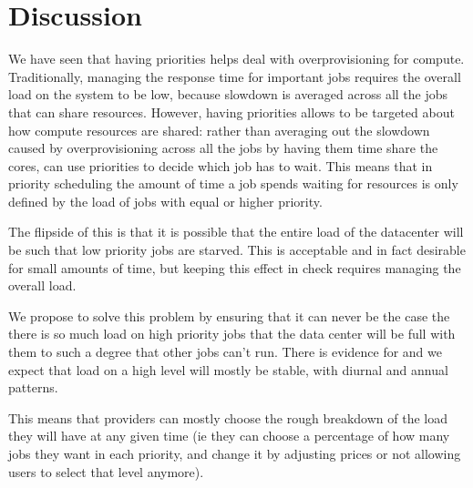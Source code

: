 \section{Discussion}


We have seen that having priorities helps \sys{} deal with overprovisioning for
compute. Traditionally, managing the response time for important jobs requires
the overall load on the system to be low, because slowdown is averaged across
all the jobs that can share resources. However, having priorities allows \sys{}
to be targeted about how compute resources are shared: rather than averaging out
the slowdown caused by overprovisioning across all the jobs by having them time
share the cores, \sys{} can use priorities to decide which job has to wait. This
means that in priority scheduling the amount of time a job spends waiting for
resources is only defined by the load of jobs with equal or higher priority.

The flipside of this is that it is possible that the entire load of the
datacenter will be such that low priority jobs are starved. This is acceptable
and in fact desirable for small amounts of time, but keeping this effect in
check requires managing the overall load. 

We propose to solve this problem by ensuring that it can never be the case the
there is so much load on high priority jobs that the data center will be full
with them to such a degree that other jobs can't run. There is evidence for and
we expect that load on a high level will mostly be stable, with diurnal and
annual patterns.\cite{TODO}

This means that providers can mostly choose the rough breakdown of the load they
will have at any given time (ie they can choose a percentage of how many jobs
they want in each priority, and change it by adjusting prices or not allowing
users to select that level anymore). 



% 
